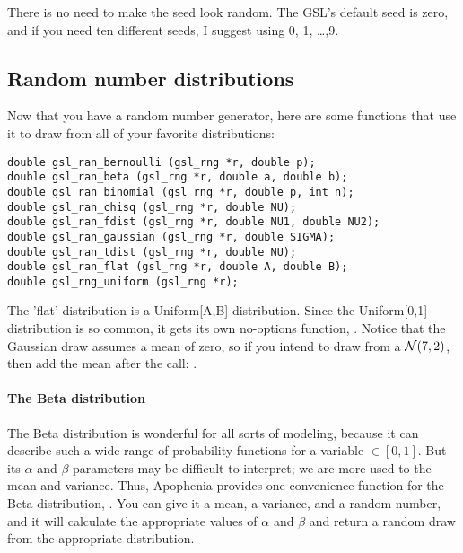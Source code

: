 There is no need to make the seed look random. The GSL's default seed is
zero, and if you need ten different seeds, I suggest using 0, 1, \dots ,9.

\subsection{Random number distributions}
Now that you have a random number generator, here are some functions that use it to draw from all of your favorite distributions:
  
   

\begin{lstlisting}
double gsl_ran_bernoulli (gsl_rng *r, double p);
double gsl_ran_beta (gsl_rng *r, double a, double b);
double gsl_ran_binomial (gsl_rng *r, double p, int n);
double gsl_ran_chisq (gsl_rng *r, double NU);
double gsl_ran_fdist (gsl_rng *r, double NU1, double NU2);
double gsl_ran_gaussian (gsl_rng *r, double SIGMA);
double gsl_ran_tdist (gsl_rng *r, double NU);
double gsl_ran_flat (gsl_rng *r, double A, double B);
double gsl_rng_uniform (gsl_rng *r);
\end{lstlisting}

The 'flat' distribution is a Uniform[A,B] distribution. Since the
Uniform[0,1] distribution is so common, it gets its own no-options
function, . Notice that the Gaussian draw
assumes a mean of zero, so if you intend to draw from a ${\cal N}(7,2)$,
then add the mean after the call: .

\paragraph{The Beta distribution}\label{beta}
The Beta distribution is wonderful for all sorts of modeling, because
it can describe such a wide range of probability functions for a
variable $\in [0,1]$.  But its $\alpha$ and $\beta$ parameters may be
difficult to interpret; we are more used to the mean and variance. Thus,
Apophenia provides one convenience function for the Beta distribution,
. You can give it a mean, a variance, and
a random number, and it will calculate the appropriate values of $\alpha$
and $\beta$ and return a random draw from the appropriate distribution.

